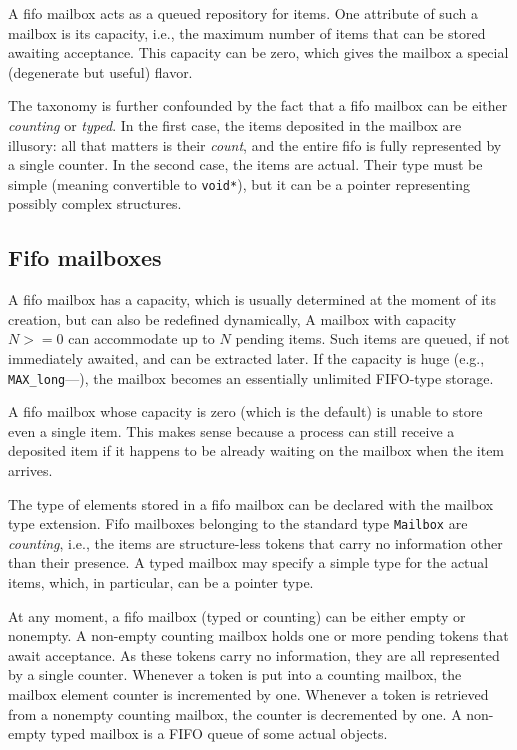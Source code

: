 A fifo mailbox acts as a queued repository for items.
One attribute of such a mailbox is its capacity, i.e., the maximum number
of items that can be stored awaiting acceptance.
This capacity can be zero, which gives the mailbox a special (degenerate but
useful) flavor.

The taxonomy is further confounded by the fact that a fifo mailbox can be
either {\em counting\/} or {\em typed}.
In the first case, the items deposited in the mailbox are illusory: all that
matters is their {\em count}, and the entire fifo is fully represented by a
single counter.
In the second case, the items are actual.
Their type must be simple (meaning convertible to {\tt void*}), but it can be a
pointer representing possibly complex structures.

\subsection{Fifo mailboxes}
\label{rm_mb_fi}

A fifo mailbox has a capacity, which is usually
determined at the moment of its creation, but can also be redefined
dynamically,
A mailbox with capacity $N>=0$
can accommodate up to $N$ pending items.
Such items are queued, if not immediately awaited, and can be extracted later.
If the capacity is huge (e.g., {\tt MAX\_long}---), the mailbox
becomes an essentially unlimited FIFO-type storage.

A fifo mailbox whose capacity is zero (which is the default)
is unable to store even a single item.
This makes sense because a process can still receive a deposited item if it
happens to be already waiting on the mailbox when the item arrives.

The type of elements stored in a fifo mailbox can be declared with the mailbox
type extension.
Fifo mailboxes belonging to the standard type {\tt Mailbox} are {\em counting},
i.e., the items are structure-less tokens
that carry no information other than their presence.
A typed mailbox may specify a simple type for the actual items, which,
in particular, can be a pointer type.

At any moment, a fifo mailbox (typed or counting) can be either empty or
nonempty.
A non-empty counting mailbox holds one or more pending
tokens that await acceptance.
As these tokens carry no information, they are all represented by a
single counter.
Whenever a token is put into a counting mailbox, the mailbox element counter
is incremented by one.
Whenever a token is retrieved from a nonempty counting mailbox, the counter
is decremented by one.
A non-empty typed mailbox is a FIFO queue of some actual objects.

